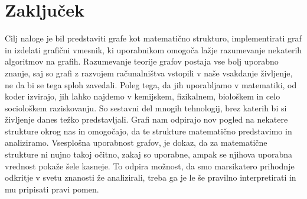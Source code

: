 \documentclass[11pt]{article}
\begin{document}
\newpage
\section{Zaključek}

Cilj naloge je bil predstaviti grafe kot matematično strukturo, implementirati graf in izdelati grafični vmesnik, ki uporabnikom omogoča lažje razumevanje nekaterih algoritmov na grafih. Razumevanje teorije grafov postaja vse bolj uporabno znanje, saj so grafi z razvojem računalništva vstopili v naše vsakdanje življenje, ne da bi se tega sploh zavedali. Poleg tega, da jih uporabljamo v matematiki, od koder izvirajo, jih lahko najdemo v kemijskem, fizikalnem, biološkem in celo sociološkem raziskovanju. So sestavni del mnogih tehnologij, brez katerih bi si življenje danes težko predstavljali. Grafi nam odpirajo nov pogled na nekatere strukture okrog nas in omogočajo, da te strukture matematično predstavimo in analiziramo. Vsesplošna uporabnost grafov, je dokaz, da za matematične strukture ni nujno takoj očitno, zakaj so uporabne, ampak se njihova uporabna vrednost pokaže šele kasneje. To odpira možnost, da smo marsikatero prihodnje odkritje v svetu znanosti že analizirali, treba ga je le še pravilno interpretirati in mu pripisati pravi pomen.

\newpage
\renewcommand{\refname}{Literatura}
\end{document}
